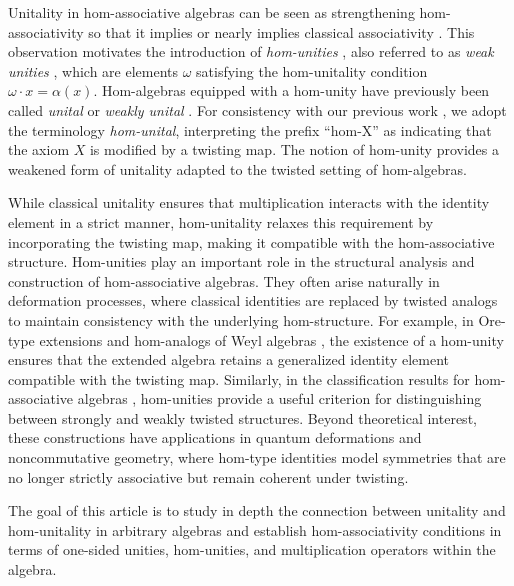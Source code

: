 \documentclass[12pt]{article}
\begin{document}
		Unitality in hom-associative algebras \cite{FreGohr:UnitCond,FreGohrSil:UnitalSurj} can be seen as strengthening hom-associativity so that it implies or nearly implies classical associativity \cite{FreGohr:UnitCond}. This observation motivates the introduction of \emph{hom-unities} \cite{FreGohrSil:UnitalSurj}, also referred to as \emph{weak unities} \cite{BackRicSil:HAOreWeakUnit,BackRic:HAWeyl}, which are elements $\omega$ satisfying the hom-unitality condition $\omega \cdot x = \alpha(x)$. Hom-algebras equipped with a hom-unity have previously been called \emph{unital} \cite{ms:homstructure,MakZah:HAclassification} or \emph{weakly unital} \cite{BackRicSil:HAOreWeakUnit,FreGohr:UnitCond}. For consistency with our previous work \cite{GarButSil:ZeroDivision}, we adopt the terminology \emph{hom-unital}, interpreting the prefix ``hom-X'' as indicating that the axiom $X$ is modified by a twisting map. The notion of hom-unity provides a weakened form of unitality adapted to the twisted setting of hom-algebras.
		
		While classical unitality ensures that multiplication interacts with the identity element in a strict manner, hom-unitality relaxes this requirement by incorporating the twisting map, making it compatible with the hom-associative structure. Hom-unities play an important role in the structural analysis and construction of hom-associative algebras. They often arise naturally in deformation processes, where classical identities are replaced by twisted analogs to maintain consistency with the underlying hom-structure. For example, in Ore-type extensions and hom-analogs of Weyl algebras \cite{BackRicSil:HAOreWeakUnit,BackRic:HAWeyl}, the existence of a hom-unity ensures that the extended algebra retains a generalized identity element compatible with the twisting map. Similarly, in the classification results for hom-associative algebras \cite{MakZah:HAclassification}, hom-unities provide a useful criterion for distinguishing between strongly and weakly twisted structures. Beyond theoretical interest, these constructions have applications in quantum deformations and noncommutative geometry, where hom-type identities model symmetries that are no longer strictly associative but remain coherent under twisting.
		
		The goal of this article is to study in depth the connection between unitality and hom-unitality in arbitrary algebras and establish hom-associativity conditions in terms of one-sided unities, hom-unities, and multiplication operators within the algebra.
\end{document}
